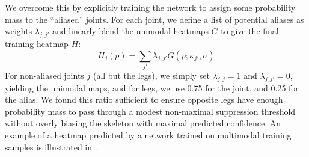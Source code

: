   We overcome this by explicitly training the network to assign some probability mass to the ``aliased'' joints. For each joint, we define a list of potential aliases as weights $\lambda_{j,j'}$ and linearly blend the unimodal heatmaps $G$ to give the final training heatmap $H$:
  \begin{equation}
      H_{j}(p) = \sum_{j'} \lambda_{j,j'} G(p; \kappa_{j'}, \sigma)
  \end{equation}
  For non-aliased joints $j$ (all but the legs), we simply set $\lambda_{j,j} = 1$ and $\lambda_{j,j'} = 0$, yielding the unimodal maps, and for legs, we use 0.75 for the joint, and 0.25 for the alias.  We found this ratio sufficient to ensure opposite legs have enough probability mass to pass through a modest non-maximal suppression threshold without overly biasing the skeleton with maximal predicted confidence. An example of a heatmap predicted by a network trained on multimodal training samples is illustrated in . 
  
